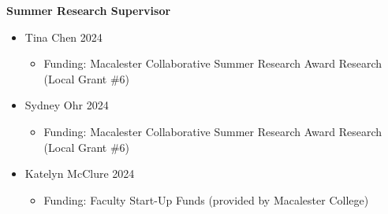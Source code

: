 \documentclass[margin]{res}
\begin{document}
\begin{resume}


\textbf{Summer Research Supervisor}
\begin{itemize}
\item Tina Chen \hfill 2024
	\begin{itemize}\vspace{-0.1cm}
	\item[]\begin{footnotesize}Funding: Macalester Collaborative Summer Research Award Research (Local Grant \#6)\end{footnotesize}
	\end{itemize}
	
\item Sydney Ohr \hfill 2024 
	\begin{itemize}\vspace{-0.1cm}
	\item[]\begin{footnotesize}Funding: Macalester Collaborative Summer Research Award Research (Local Grant \#6) \end{footnotesize}
	\end{itemize}
	
\item Katelyn McClure \hfill 2024 
	\begin{itemize}\vspace{-0.1cm}
	\item[]\begin{footnotesize}Funding: Faculty Start-Up Funds (provided by Macalester College)\end{footnotesize}
	\end{itemize}


\end{itemize}
\end{resume}
\end{document}

